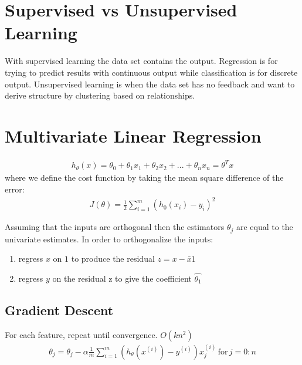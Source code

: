 \documentclass[12pt]{article}
\begin{document}
	\maketitle
	
\section{Supervised vs Unsupervised Learning}
With supervised learning the data set contains the output. Regression is for trying to predict results with continuous output while classification is for discrete output. Unsupervised learning is when the data set has no feedback and want to derive structure by clustering based on relationships.

\section{Multivariate Linear Regression}
\begin{align*}
	h_\theta (x) = \theta_0 + \theta_1 x_1 + \theta_2 x_2 + ... + \theta_nx_n = \theta^Tx
\end{align*}
where we define the cost function by taking the mean square difference of the error:
\begin{align*}
	J(\theta)=\frac{1}{2}\sum_{i=1}^{m}(h_0(x_i)-y_i)^2
\end{align*}

Assuming that the inputs are orthogonal then the estimators $\theta_j$ are equal to the univariate estimates. In order to orthogonalize the inputs:

\begin{enumerate}
    \item regress $x$ on $1$ to produce the residual $z=x-\bar{x}1$ 
    \item regress $y$ on the residual z to give the coefficient $\hat{\theta_1}$
\end{enumerate}


\subsection{Gradient Descent}
For each feature, repeat until convergence. $O(kn^2)$
\begin{align*}
	\theta_j = \theta_j - \alpha\frac{1}{m}\sum_{i=1}^{m}(h_\theta (x^{(i)})-y^{(i)})x_j^{(i)}\,\text{for}\, j=0:n
\end{align*}
\end{document}
